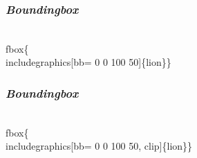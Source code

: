 \documentclass[svgnames,%
	ucs,%
	pdftex]{guitbeamer}
\begin{document}

\begin{frame}
  \frametitle{\textsl{Boundingbox}}
	\begin{LaTeXcode}
		\\fbox\{\\includegraphics[bb= 0 0 100 \alert{50}]\{lion\}\}
	\end{LaTeXcode}
	\begin{center}
	\end{center}
\end{frame}
\begin{frame}
  \frametitle{\textsl{Boundingbox}}
	\begin{LaTeXcode}
		\\fbox\{\\includegraphics[bb= 0 0 100 50, \alert{clip}]\{lion\}\}
	\end{LaTeXcode}
	\begin{center}
	\end{center}
\end{frame}
\end{document}
